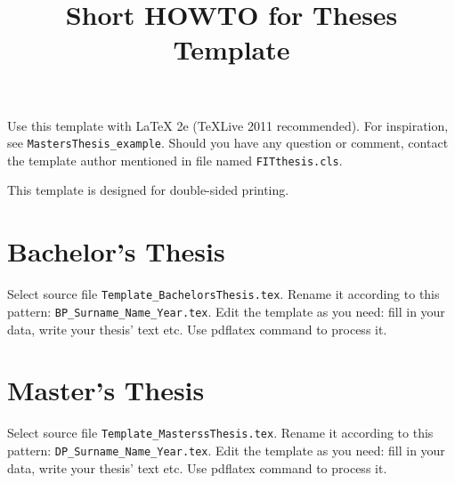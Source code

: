 \documentclass[a4paper]{article}
\title{Short HOWTO for Theses Template}
\author{}
\date{}
\begin{document}
\maketitle

\thispagestyle{empty}

Use this template with \LaTeX{} 2e (TeXLive 2011 recommended). For inspiration, see \verb|MastersThesis_example|. Should you have any question or comment, contact the template author mentioned in file named \verb|FITthesis.cls|.

This template is designed for double-sided printing.

\section{Bachelor's Thesis}

Select source file \verb|Template_BachelorsThesis.tex|. Rename it according to this pattern: \verb|BP_Surname_Name_Year.tex|. Edit the template as you need: fill in your data, write your thesis' text etc. Use pdflatex command to process it.

\section{Master's Thesis}

Select source file \verb|Template_MasterssThesis.tex|. Rename it according to this pattern: \verb|DP_Surname_Name_Year.tex|. Edit the template as you need: fill in your data, write your thesis' text etc. Use pdflatex command to process it.
\end{document}
